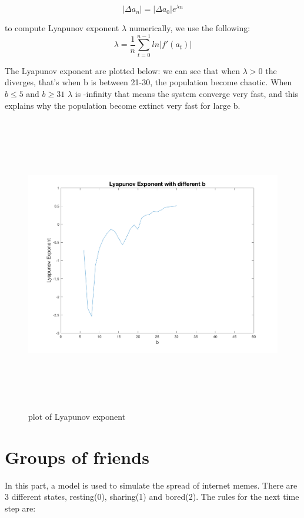 \documentclass[12pt]{article}
\begin{document}
\begin{equation}
	|\Delta a_{n}| = |\Delta a_{0}| e^{\lambda n}
\end{equation}

to compute Lyapunov exponent $\lambda$ numerically, we use the following:
\begin{equation}
	\lambda = \frac{1}{n} \sum_{t=0}^{n-1} ln |f'(a_{t})|
\end{equation}

The Lyapunov exponent are plotted below: we can see that when $\lambda > 0$ the diverges, that's when b is between 21-30, the population become chaotic. When $b \leq 5$ and $b \geq 31$ $\lambda$ is -infinity that means the system converge very fast, and this explains why the population become extinct very fast for large b. 

\begin{figure}[H] %
\centering
\includegraphics[width = 16 cm, height = 13cm]{lyapunov_exp.png}
\caption{plot of Lyapunov exponent}
\label{fig:p1q1lya}
\end{figure}



\newpage
\section{Groups of friends}
\doublespacing
In this part, a model is used to simulate the spread of internet memes. There are 3 different states, resting(0), sharing(1) and bored(2). The rules for the next time step are:
\end{document}
